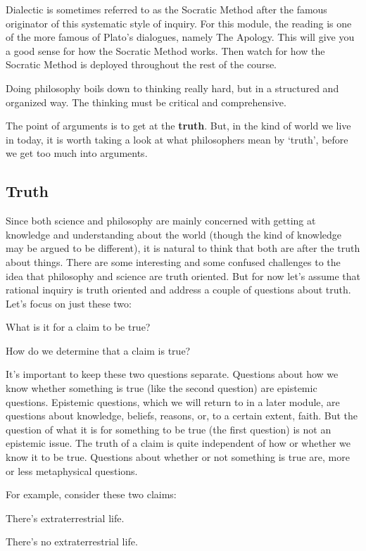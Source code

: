 Dialectic is sometimes referred to as the Socratic Method after the famous originator of this systematic style of inquiry. For this module, the reading is one of the more famous of Plato’s dialogues, namely The Apology. This will give you a good sense for how the Socratic Method works. Then watch for how the Socratic Method is deployed throughout the rest of the course.

Doing philosophy boils down to thinking really hard, but in a structured and organized way. The thinking must be critical and comprehensive.

The point of arguments is to get at the \textbf{truth}. But, in the kind of world we live in today, it is worth taking a look at what philosophers mean by `truth', before we get too much into arguments.

\subsection{Truth}
\label{s:p1.1.1}
Since both science and philosophy are mainly concerned with getting at knowledge and understanding about the world (though the kind of knowledge may be argued to be different), it is natural to think that both are after the truth about things. There are some interesting and some confused challenges to the idea that philosophy and science are truth oriented. But for now let’s assume that rational inquiry is truth oriented and address a couple of questions about truth. Let’s focus on just these two:
\begin{earg}
    \item[\ex{truth1}] What is it for a claim to be true?
    \item[\ex{truth2}] How do we determine that a claim is true?
\end{earg}
It’s important to keep these two questions separate. Questions about how we know whether something is true (like the second question) are epistemic questions. Epistemic questions, which we will return to in a later module, are questions about knowledge, beliefs, reasons, or, to a certain extent, faith. But the question of what it is for something to be true (the first question) is not an epistemic issue. The truth of a claim is quite independent of how or whether we know it to be true. Questions about whether or not something is true are, more or less metaphysical questions.

For example, consider these two claims:

\begin{earg}
    \item[] There's extraterrestrial life.
    \item[] There's no extraterrestrial life. 
\end{earg}


